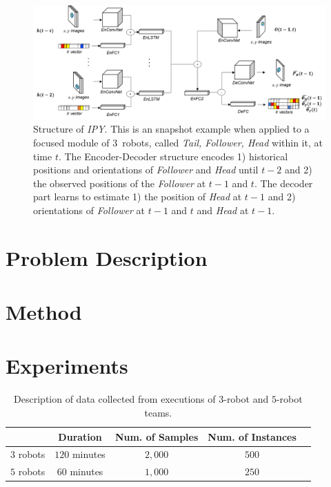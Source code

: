 \documentclass[letterpaper, 10 pt, conference]{ieeeconf}  %
\begin{document}
	\begin{figure}\centering
		\includegraphics[width=1.8\columnwidth]{fig_DL_Pipeline}
		\caption{Structure of \emph{IPY}. This is an snapshot example when applied to a focused module of
			$3$~robots, called \emph{Tail, Follower, Head} within it, at time $t$. 
			The Encoder-Decoder structure encodes
			1) historical positions and orientations of \emph{Follower} and \emph{Head} 
			until $t-2$ and 2) the observed positions of the \emph{Follower} at $t-1$ and $t$. 
			The decoder part learns to estimate 1) the position of \emph{Head} at $t-1$ and 
			2) orientations of \emph{Follower} at $t-1$ and $t$ and \emph{Head} at $t-1$.   
		}
		\label{fig:DL_Pipeline}
	\end{figure}
	
	\section{Problem Description} 
	\label{sec:problem_description}
	
	\section{Method}
	\label{sec:method}
	
	
	\section{Experiments} 
	\label{sec:experiments} 
	
	
	\begin{table}[]
		\label{table:data_description}
		\begin{tabular}{|c|c|c|c|c|}
			\hline
						&  Duration & Num. of Samples & Num. of Instances  \\ \hline
			$3$ robots & $120$ minutes & $2,000$ & $500$  \\ \hline
			$5$ robots & $60$ minutes  & $1,000$ & $250$  \\ \hline
		\end{tabular}
		\caption{Description of data collected from executions of $3$-robot and $5$-robot teams.}
	\end{table}
	
\end{document}
